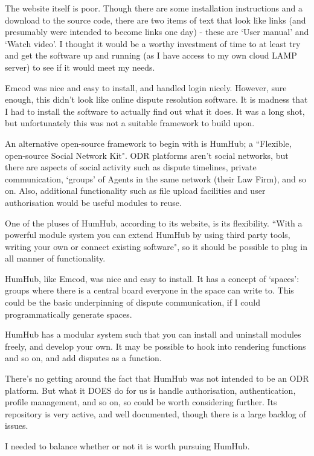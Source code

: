 The website itself is poor. Though there are some installation instructions and a download to the source code, there are two items of text that look like links (and presumably were intended to become links one day) - these are `User manual' and `Watch video'. I thought it would be a worthy investment of time to at least try and get the software up and running (as I have access to my own cloud LAMP server) to see if it would meet my needs.

Emcod was nice and easy to install, and handled login nicely. However, sure enough, this didn't look like online dispute resolution software. It is madness that I had to install the software to actually find out what it does. It was a long shot, but unfortunately this was not a suitable framework to build upon.

An alternative open-source framework to begin with is HumHub; a ``Flexible, open-source Social Network Kit". ODR platforms aren't social networks, but there are aspects of social activity such as dispute timelines, private communication, `groups' of Agents in the same network (their Law Firm), and so on. Also, additional functionality such as file upload facilities and user authorisation would be useful modules to reuse.

One of the pluses of HumHub, according to its website, is its flexibility. ``With a powerful module system you can extend HumHub by using third party tools, writing your own or connect existing software", so it should be possible to plug in all manner of functionality.

HumHub, like Emcod, was nice and easy to install. It has a concept of `spaces': groups where there is a central board everyone in the space can write to. This could be the basic underpinning of dispute communication, if I could programmatically generate spaces.

HumHub has a modular system such that you can install and uninstall modules freely, and develop your own. It may be possible to hook into rendering functions and so on, and add disputes as a function.

There's no getting around the fact that HumHub was not intended to be an ODR platform. But what it DOES do for us is handle authorisation, authentication, profile management, and so on, so could be worth considering further. Its repository is very active, and well documented, though there is a large backlog of issues.

I needed to balance whether or not it is worth pursuing HumHub.


